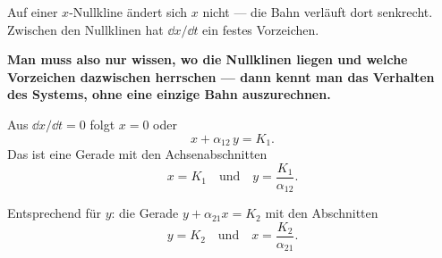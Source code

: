 \begin{merksatz}
Auf einer $x$-Nullkline ändert sich $x$ nicht --- die Bahn verläuft dort senkrecht. Zwischen den Nullklinen hat $\dd x/\dd t$ ein festes Vorzeichen.

\begin{center}
\begin{minipage}{0.9\textwidth}
\textbf{Man muss also nur wissen, wo die Nullklinen liegen und welche Vorzeichen dazwischen herrschen --- dann kennt man das Verhalten des Systems, ohne eine einzige Bahn auszurechnen.}
\end{minipage}
\end{center}

Aus $\dd x/\dd t = 0$ folgt $x = 0$ oder
\[ x + \alpha_{12}\,y = K_1 . \]
Das ist eine Gerade mit den Achsenabschnitten
\[ x = K_1 \quad\text{und}\quad y = \frac{K_1}{\alpha_{12}} . \]

Entsprechend für $y$: die Gerade $y + \alpha_{21}x = K_2$ mit den Abschnitten
\[ y = K_2 \quad\text{und}\quad x = \frac{K_2}{\alpha_{21}} . \]

\begin{center}
\begin{minipage}{0.88\textwidth}
\end{minipage}
\end{center}
\end{merksatz}

